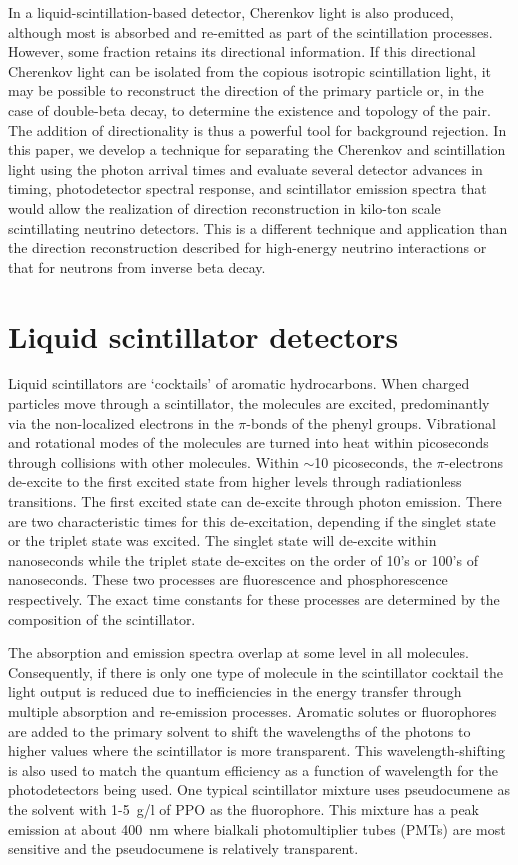 \documentclass[cits]{JINST}
\begin{document}
In a liquid-scintillation-based detector, Cherenkov light is also
produced, although most is absorbed and re-emitted as part of the
scintillation processes.  However, some fraction retains its
directional information. If this directional Cherenkov light can be
isolated from the copious isotropic scintillation light, it may be
possible to reconstruct the direction of the primary particle or, in
the case of double-beta decay, to determine the existence and topology
of the pair.  The addition of directionality is thus a powerful tool
for background rejection.  In this paper, we develop a technique for
separating the Cherenkov and scintillation light using the photon arrival
times and evaluate several detector advances in timing, photodetector 
spectral response, and scintillator emission spectra that would allow
the realization of direction reconstruction in kilo-ton scale
scintillating neutrino detectors. This is a different technique and application than the direction reconstruction described for high-energy neutrino interactions\cite{john} or that for neutrons from inverse beta decay\cite{chooz,dcDirection}. 

\section{Liquid scintillator detectors}
Liquid scintillators are `cocktails' of aromatic hydrocarbons. When
charged particles move through a scintillator, the molecules are
excited, predominantly via the non-localized electrons in the
$\pi$-bonds of the phenyl groups\cite{birks_book}. Vibrational
and rotational modes of the molecules are turned into heat within
picoseconds through collisions with other molecules.  Within $\sim$10
picoseconds, the $\pi$-electrons de-excite to the first excited state
from higher levels through radiationless transitions. The first
excited state can de-excite through photon emission. There are two
characteristic times for this de-excitation, depending if the singlet
state or the triplet state was excited.  The singlet state will
de-excite within nanoseconds while the triplet state de-excites on the
order of 10's or 100's of nanoseconds. These two processes are
fluorescence and phosphorescence respectively. The exact time
constants for these processes are determined by the composition of the
scintillator.

The absorption and emission spectra overlap at some level
in all molecules. Consequently, if there is only one type of molecule in
the scintillator cocktail the light output is reduced due to
inefficiencies in the energy transfer through multiple absorption and
re-emission processes. Aromatic solutes or fluorophores are added to the
primary solvent to shift the wavelengths of the photons to higher values 
where the scintillator is more transparent. This
wavelength-shifting is also used to match the quantum efficiency as a
function of wavelength for the photodetectors being used. One typical
scintillator mixture uses pseudocumene as the solvent with 1-5~g/l of
PPO as the fluorophore. This mixture has a peak emission at about 400~nm
where bialkali photomultiplier tubes (PMTs) are most sensitive and the
pseudocumene is relatively transparent.
\end{document}
